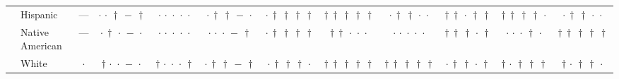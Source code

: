 {\begin{longtable}[t]{llcccccccccc}
 & Hispanic & --- & ${\cdot}\,{\cdot}\,{\dagger}\,{-}\,{\dagger}$ & ${\cdot}\,{\cdot}\,{\cdot}\,{\cdot}\,{\cdot}$ & ${\cdot}\,{\dagger}\,{\dagger}\,{-}\,{\cdot}$ & ${\cdot}\,{\dagger}\,{\dagger}\,{\dagger}\,{\dagger}$ & ${\dagger}\,{\dagger}\,{\dagger}\,{\dagger}\,{\dagger}$ & ${\cdot}\,{\dagger}\,{\dagger}\,{\cdot}\,{\cdot}$ & ${\dagger}\,{\dagger}\,{\cdot}\,{\dagger}\,{\dagger}$ & ${\dagger}\,{\dagger}\,{\dagger}\,{\dagger}\,{\cdot}$ & ${\cdot}\,{\dagger}\,{\dagger}\,{\cdot}\,{\cdot}$ \\
 & Native American & --- & ${\cdot}\,{\dagger}\,{\cdot}\,{-}\,{\cdot}$ & ${\cdot}\,{\cdot}\,{\cdot}\,{\cdot}\,{\cdot}$ & ${\cdot}\,{\cdot}\,{\cdot}\,{-}\,{\dagger}$ & ${\cdot}\,{\dagger}\,{\dagger}\,{\dagger}\,{\dagger}$ & ${\dagger}\,{\dagger}\,{\cdot}\,{\cdot}\,{\cdot}$ & ${\cdot}\,{\cdot}\,{\cdot}\,{\cdot}\,{\cdot}$ & ${\dagger}\,{\dagger}\,{\dagger}\,{\cdot}\,{\dagger}$ & ${\cdot}\,{\cdot}\,{\cdot}\,{\dagger}\,{\cdot}$ & ${\dagger}\,{\dagger}\,{\dagger}\,{\dagger}\,{\dagger}$ \\
 & White & $\cdot$ & ${\dagger}\,{\cdot}\,{\cdot}\,{-}\,{\cdot}$ & ${\dagger}\,{\cdot}\,{\cdot}\,{\cdot}\,{\dagger}$ & ${\cdot}\,{\dagger}\,{\dagger}\,{-}\,{\dagger}$ & ${\cdot}\,{\dagger}\,{\dagger}\,{\dagger}\,{\cdot}$ & ${\dagger}\,{\dagger}\,{\dagger}\,{\dagger}\,{\dagger}$ & ${\dagger}\,{\dagger}\,{\dagger}\,{\dagger}\,{\dagger}$ & ${\cdot}\,{\dagger}\,{\dagger}\,{\cdot}\,{\dagger}$ & ${\dagger}\,{\cdot}\,{\dagger}\,{\dagger}\,{\dagger}$ & ${\dagger}\,{\cdot}\,{\dagger}\,{\dagger}\,{\cdot}$ \\
\cline{1-12}
\end{longtable}
}
